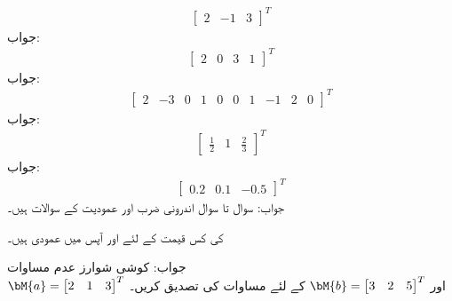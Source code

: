 \begin{align*}
\begin{bmatrix}2&-1&3  \end{bmatrix}^T
\end{align*}
جواب:
\begin{align*}
\begin{bmatrix}2&0&3&1  \end{bmatrix}^T
\end{align*}
جواب:
\begin{align*}
\begin{bmatrix}2&-3&0&1&0&0&1&-1&2&0 \end{bmatrix}^T
\end{align*}
جواب:
\begin{align*}
\begin{bmatrix}\tfrac{1}{2}&1&\tfrac{2}{3} \end{bmatrix}^T
\end{align*}
جواب:
\begin{align*}
\begin{bmatrix}0.2&0.1&-0.5 \end{bmatrix}^T
\end{align*}
جواب:
سوال  تا سوال  اندرونی ضرب اور عمودیت کے سوالات ہیں۔

 کی کس قیمت کے لئے  اور
  آپس میں عمودی ہیں۔

جواب:
\quad کوشی شوارز عدم مساوات\\
\begin{math}
\bM{a}=\begin{bmatrix}2&1&3\end{bmatrix}^T
\end{math}
اور
\begin{math}
\bM{b}=\begin{bmatrix}3&2&5\end{bmatrix}^T
\end{math}
کے لئے مساوات  کی تصدیق کریں۔

